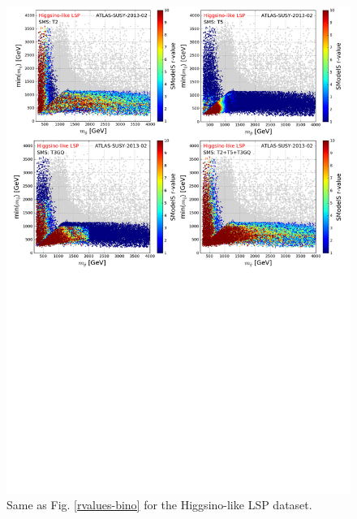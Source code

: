 \documentclass[epj,nopacs,fleqn]{svjour}
\begin{document}
\begin{figure}[!]
\begin{center}
\includegraphics[width=1\textwidth]{PLOTS/App/Higgsino_Combo.pdf}
\end{center}
\caption{Same as Fig. \ref{rvalues-bino} for the Higgsino-like LSP dataset.} 
\label{rvalues-higgsino}
\end{figure}


\TWO
\end{document}
